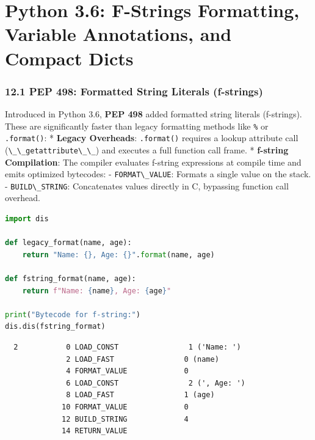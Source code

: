 \hypertarget{python-3.6-f-strings-formatting-variable-annotations-and-compact-dicts}{%
\chapter{Python 3.6: F-Strings Formatting, Variable Annotations, and
Compact
Dicts}\label{python-3.6-f-strings-formatting-variable-annotations-and-compact-dicts}}

\hypertarget{pep-498-formatted-string-literals-f-strings}{%
\subsection{12.1 PEP 498: Formatted String Literals
(f-strings)}\label{pep-498-formatted-string-literals-f-strings}}

Introduced in Python 3.6, \textbf{PEP 498} added formatted string
literals (f-strings). These are significantly faster than legacy
formatting methods like \passthrough{\lstinline!\%!} or
\passthrough{\lstinline!.format()!}: * \textbf{Legacy Overheads}:
\passthrough{\lstinline!.format()!} requires a lookup attribute call
(\passthrough{\lstinline!\_\_getattribute\_\_!}) and executes a full
function call frame. * \textbf{f-string Compilation}: The compiler
evaluates f-string expressions at compile time and emits optimized
bytecodes: - \passthrough{\lstinline!FORMAT\_VALUE!}: Formats a single
value on the stack. - \passthrough{\lstinline!BUILD\_STRING!}:
Concatenates values directly in C, bypassing function call overhead.

\begin{lstlisting}[language=Python]
import dis

def legacy_format(name, age):
    return "Name: {}, Age: {}".format(name, age)

def fstring_format(name, age):
    return f"Name: {name}, Age: {age}"

print("Bytecode for f-string:")
dis.dis(fstring_format)
\end{lstlisting}

\begin{lstlisting}
  2           0 LOAD_CONST                1 ('Name: ')
              2 LOAD_FAST                0 (name)
              4 FORMAT_VALUE             0
              6 LOAD_CONST                2 (', Age: ')
              8 LOAD_FAST                1 (age)
             10 FORMAT_VALUE             0
             12 BUILD_STRING             4
             14 RETURN_VALUE
\end{lstlisting}

